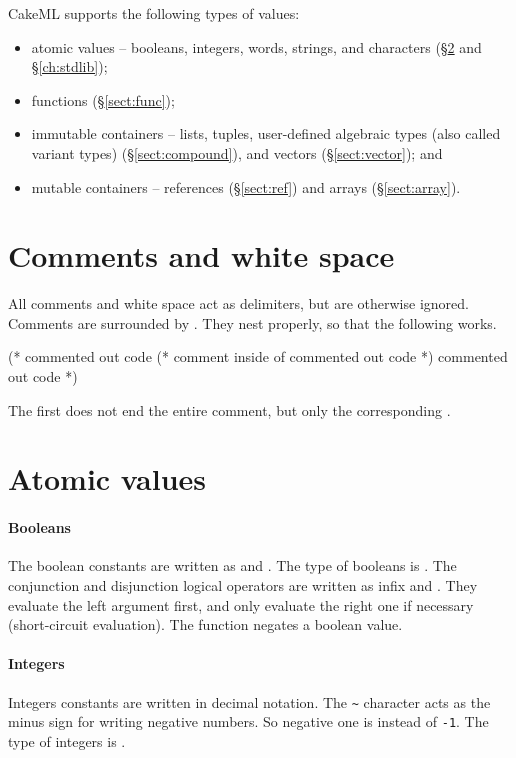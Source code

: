 \documentclass[12pt,a4paper]{book}
\begin{document}
CakeML supports the following types of values:
\begin{itemize}
  \item atomic values -- booleans, integers, words, strings, and characters (\S\ref{sect:val} and \S\ref{ch:stdlib});
  \item functions (\S\ref{sect:func});
  \item immutable containers -- lists, tuples, user-defined algebraic types (also called variant types) (\S\ref{sect:compound}), and vectors (\S\ref{sect:vector}); and
  \item mutable containers -- references (\S\ref{sect:ref}) and arrays (\S\ref{sect:array}).
\end{itemize}

\section{Comments and white space}
All comments and white space act as delimiters, but are otherwise ignored. Comments are surrounded by \smlinline{(* *)}. They nest properly, so that the following works.\begin{smlcode}
(*
  commented out code
  (* comment inside of commented out code *)
  commented out code
*)
\end{smlcode}
The first \smlinline{*)} does not end the entire comment, but only the
corresponding \smlinline{(*}.


\section{Atomic values}
\label{sect:val}

\paragraph{Booleans} The boolean constants are written as  and
. The type of booleans is . The conjunction and
disjunction logical operators are written as infix  and
. They evaluate the left argument first, and only evaluate the
right one if necessary (short-circuit evaluation). The  function
negates a boolean value.

\paragraph{Integers} Integers constants are written in decimal notation. The
\texttt{\textasciitilde} character acts as the minus sign for writing negative
numbers. So negative one is  instead of \texttt{-1}. The type of integers is
.
\end{document}
